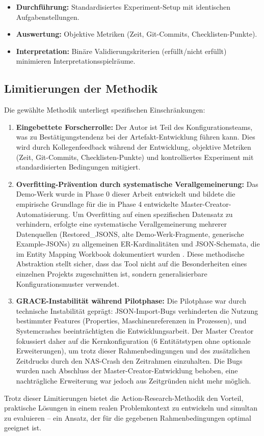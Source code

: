 \begin{itemize}
    \item \textbf{Durchführung:} Standardisiertes Experiment-Setup mit identischen Aufgabenstellungen.
    \item \textbf{Auswertung:} Objektive Metriken (Zeit, Git-Commits, Checklisten-Punkte).
    \item \textbf{Interpretation:} Binäre Validierungskriterien (erfüllt/nicht erfüllt) minimieren Interpretationsspielräume.
\end{itemize}


\subsection{Limitierungen der Methodik}
\label{subsec:LimitierungenMethodik}

Die gewählte Methodik unterliegt spezifischen Einschränkungen:

\begin{enumerate}
    \item \textbf{Eingebettete Forscherrolle:} Der Autor ist Teil des Konfigurationsteams, was zu Bestätigungstendenz bei der Artefakt-Entwicklung führen kann. Dies wird durch Kollegenfeedback während der Entwicklung, objektive Metriken (Zeit, Git-Commits, Checklisten-Punkte) und kontrolliertes Experiment mit standardisierten Bedingungen mitigiert.

    \item \textbf{Overfitting-Prävention durch systematische Verallgemeinerung:} Das Demo-Werk wurde in Phase 0 dieser Arbeit entwickelt und bildete die empirische Grundlage für die in Phase 4 entwickelte Master-Creator-Automatisierung. Um Overfitting auf einen spezifischen Datensatz zu verhindern, erfolgte eine systematische Verallgemeinerung mehrerer Datenquellen (Restored\_JSONS, alte Demo-Werk-Fragmente, generische Example-JSONs) zu allgemeinen ER-Kardinalitäten und JSON-Schemata, die im Entity Mapping Workbook dokumentiert wurden \citep{mayring:qualitative2015}. Diese methodische Abstraktion stellt sicher, dass das Tool nicht auf die Besonderheiten eines einzelnen Projekts zugeschnitten ist, sondern generalisierbare Konfigurationsmuster verwendet.

    \item \textbf{GRACE-Instabilität während Pilotphase:} Die Pilotphase war durch technische Instabilität geprägt: JSON-Import-Bugs verhinderten die Nutzung bestimmter Features (Properties, Maschinenreferenzen in Prozessen), und Systemcrashes beeinträchtigten die Entwicklungsarbeit. Der Master Creator fokussiert daher auf die Kernkonfiguration (6 Entitätstypen ohne optionale Erweiterungen), um trotz dieser Rahmenbedingungen und des zusätzlichen Zeitdrucks durch den NAS-Crash den Zeitrahmen einzuhalten. Die Bugs wurden nach Abschluss der Master-Creator-Entwicklung behoben, eine nachträgliche Erweiterung war jedoch aus Zeitgründen nicht mehr möglich.
\end{enumerate}

Trotz dieser Limitierungen bietet die Action-Research-Methodik den Vorteil, praktische Lösungen in einem realen Problemkontext zu entwickeln und simultan zu evaluieren -- ein Ansatz, der für die gegebenen Rahmenbedingungen optimal geeignet ist.
